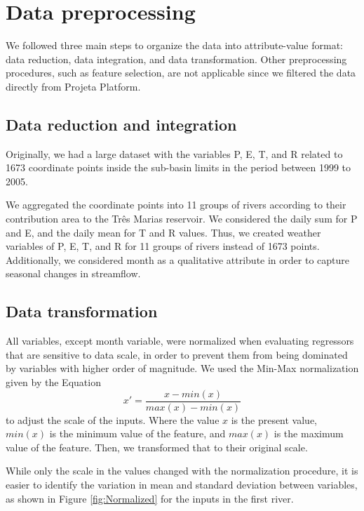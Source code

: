 \documentclass[12pt]{article}
\begin{document}
\section{Data preprocessing}

We followed three main steps to organize the data into attribute-value format: data reduction, data integration, and data transformation. Other preprocessing procedures, such as feature selection, are not applicable since we filtered the data directly from Projeta Platform.

\subsection{Data reduction and integration}

Originally, we had a large dataset with the variables P, E, T, and R related to 1673 coordinate points inside the sub-basin limits in the period between 1999 to 2005.

We aggregated the coordinate points into 11 groups of rivers according to their contribution area to the Três Marias reservoir. We considered the daily sum for P and E, and the daily mean for T and R values. Thus, we created weather variables of P, E, T, and R for 11 groups of rivers instead of 1673 points. Additionally, we considered month as a qualitative attribute in order to capture seasonal changes in streamflow.

\subsection{Data transformation} \label{sec:DataTransformation}

All variables, except month variable, were normalized when evaluating regressors that are sensitive to data scale, in order to prevent them from being dominated by variables with higher order of magnitude. We used the Min-Max normalization given by the Equation
    \begin{equation}
    \label{eqn:Normalization}
    x' = \frac{x-min(x)}{max(x)-min(x)}
    \end{equation}
to adjust the scale of the inputs. Where the value $x$ is the present value, $min(x)$ is the minimum value of the feature, and $max(x)$ is the maximum value of the feature. Then, we transformed that to their original scale.

While only the scale in the values changed with the normalization procedure, it is easier to identify the variation in mean and standard deviation between variables, as shown in Figure \ref{fig:Normalized} for the inputs in the first river.
\end{document}
